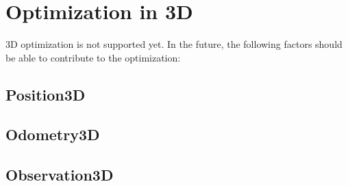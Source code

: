 \section{Optimization in 3D}

3D optimization is not supported yet. In the future, the following factors should be able to contribute to the optimization:

\subsection{Position3D}

\subsection{Odometry3D}

\subsection{Observation3D}
